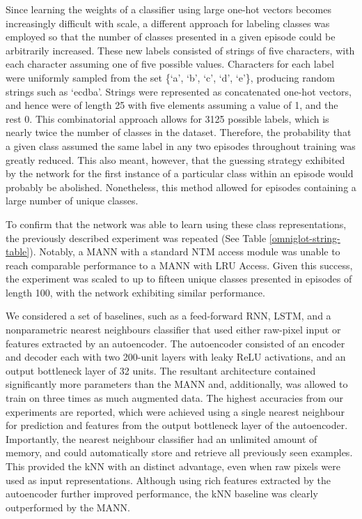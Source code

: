 \documentclass{article}
\begin{document}
Since learning the weights of a classifier using large one-hot vectors becomes increasingly difficult with scale, a different approach for labeling classes was employed so that the number of classes presented in a given episode could be arbitrarily increased. These new labels consisted of strings of five characters, with each character assuming one of five possible values. Characters for each label were uniformly sampled from the set \{`a', `b', `c', `d', `e'\}, producing random strings such as `ecdba'. Strings were represented as concatenated one-hot vectors, and hence were of length 25 with five elements assuming a value of 1, and the rest 0. This combinatorial approach allows for 3125 possible labels, which is nearly twice the number of classes in the dataset. Therefore, the probability that a given class assumed the same label in any two episodes throughout training was greatly reduced. This also meant, however, that the guessing strategy exhibited by the network for the first instance of a particular class within an episode would probably be abolished. Nonetheless, this method allowed for episodes containing a large number of unique classes.

To confirm that the network was able to learn using these class representations, the previously described experiment was repeated (See Table \ref{omniglot-string-table}). Notably, a MANN with a standard NTM access module was unable to reach comparable performance to a MANN with LRU Access. Given this success, the experiment was scaled to up to fifteen unique classes presented in episodes of length 100, with the network exhibiting similar performance. 

We considered a set of baselines, such as a feed-forward RNN, LSTM, and a nonparametric nearest neighbours classifier that used either raw-pixel input or features extracted by an autoencoder. The autoencoder consisted of an encoder and decoder each with two 200-unit layers with leaky ReLU activations, and an output bottleneck layer of 32 units. The resultant architecture contained significantly more parameters than the MANN and, additionally, was allowed to train on three times as much augmented data. The highest accuracies from our experiments are reported, which were achieved using a single nearest neighbour for prediction and features from the output bottleneck layer of the autoencoder. Importantly, the nearest neighbour classifier had an unlimited amount of memory, and could automatically store and retrieve all previously seen examples. This provided the kNN with an distinct advantage, even when raw pixels were used as input representations. Although using rich features extracted by the autoencoder further improved performance, the kNN baseline was clearly outperformed by the MANN.
\end{document}
